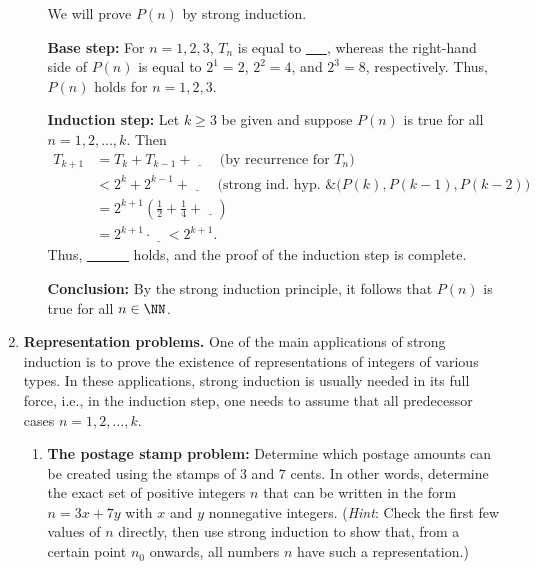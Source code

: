 \begin{enumerate}
\begin{enumerate}
We will prove $P(n)$ by strong induction.

\textbf{Base step:} 
For $n=1,2,3$, $T_n$ is equal to \underline{~~~}, whereas the
right-hand side of $P(n)$ is equal to $2^1=2$, $2^2=4$, and $2^3=8$,
respectively. Thus, $P(n)$ holds for $n=1,2,3$.

\textbf{Induction step:} Let $k\ge3$ be given and suppose 
$P(n)$ is true for all $n=1,2,\dots,k$. Then
\begin{align*}
T_{k+1}&=T_{k}+T_{k-1}+\underline{~~~~}
\quad \text{(by recurrence for $T_n$)}
\\
&<2^{k}+2^{k-1}+\underline{~~~~} \quad \text{(strong ind. hyp. \& ($P(k), P(k-1),P(k-2)$)}
\\
&=2^{k+1}\left(\frac12+\frac14+\underline{~~~~}\right)
\\
&=2^{k+1}\cdot \underline{~~~~}
<2^{k+1}.
\end{align*}
Thus, \underline{~~~~~~} holds, and the proof of the induction step is complete. 

\textbf{Conclusion:} By the strong induction principle,  it follows that
$P(n)$  is true for all $n\in\NN$.  
 
\end{enumerate}






\item\textbf{Representation problems.}
One of the main applications of strong induction is to prove the existence of
representations of integers of various types. In these applications, strong
induction is usually needed in its full force, i.e., in the induction step, one
needs to assume that all predecessor cases $n=1,2,\dots,k$. 

\begin{enumerate}


\item \textbf{The postage stamp problem:}
Determine which postage amounts can be created using the stamps  of $3$
and $7$ cents.  In other words, determine the exact set of positive
integers $n$ that can be written in the form $n=3x+7y$ with $x$ and $y$
nonnegative integers.  (\emph{Hint}: Check the first few values of $n$ directly,
then use strong induction to show that, from a certain point $n_0$
onwards, all numbers $n$ have such a representation.) 





\end{enumerate}
\end{enumerate}
